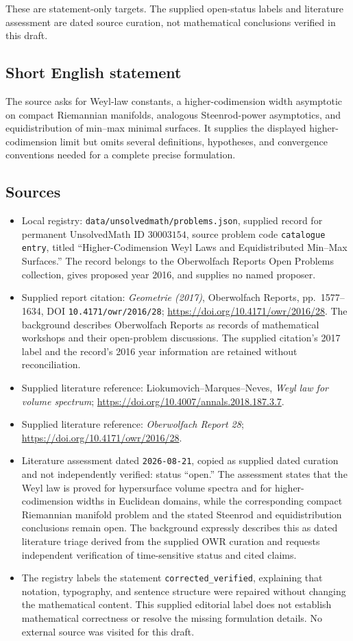 \documentclass[11pt]{article}
\begin{document}
These are statement-only targets. The supplied open-status labels and literature assessment are dated source curation, not mathematical conclusions verified in this draft.
\subsection{Short English statement}
The source asks for Weyl-law constants, a higher-codimension width asymptotic on compact Riemannian manifolds, analogous Steenrod-power asymptotics, and equidistribution of min--max minimal surfaces. It supplies the displayed higher-codimension limit but omits several definitions, hypotheses, and convergence conventions needed for a complete precise formulation.
\subsection{Sources}
\begin{itemize}
\item Local registry: \texttt{data/unsolvedmath/problems.json}, supplied record for permanent UnsolvedMath ID \(30003154\), source problem code \texttt{catalogue entry}, titled ``Higher-Codimension Weyl Laws and Equidistributed Min--Max Surfaces.'' The record belongs to the Oberwolfach Reports Open Problems collection, gives proposed year 2016, and supplies no named proposer.
\item Supplied report citation: \emph{Geometrie (2017)}, Oberwolfach Reports, pp.~1577--1634, DOI \texttt{10.4171/owr/2016/28}; \url{https://doi.org/10.4171/owr/2016/28}. The background describes Oberwolfach Reports as records of mathematical workshops and their open-problem discussions. The supplied citation's 2017 label and the record's 2016 year information are retained without reconciliation.
\item Supplied literature reference: Liokumovich--Marques--Neves, \emph{Weyl law for volume spectrum}; \url{https://doi.org/10.4007/annals.2018.187.3.7}.
\item Supplied literature reference: \emph{Oberwolfach Report 28}; \url{https://doi.org/10.4171/owr/2016/28}.
\item Literature assessment dated \texttt{2026-08-21}, copied as supplied dated curation and not independently verified: status ``open.'' The assessment states that the Weyl law is proved for hypersurface volume spectra and for higher-codimension widths in Euclidean domains, while the corresponding compact Riemannian manifold problem and the stated Steenrod and equidistribution conclusions remain open. The background expressly describes this as dated literature triage derived from the supplied OWR curation and requests independent verification of time-sensitive status and cited claims.
\item The registry labels the statement \texttt{corrected\_verified}, explaining that notation, typography, and sentence structure were repaired without changing the mathematical content. This supplied editorial label does not establish mathematical correctness or resolve the missing formulation details. No external source was visited for this draft.
\end{itemize}
\end{document}
